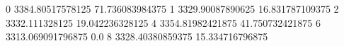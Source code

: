 0 3384.80517578125 71.736083984375
1 3329.90087890625 16.831787109375
2 3332.111328125 19.042236328125
4 3354.81982421875 41.750732421875
6 3313.069091796875 0.0
8 3328.40380859375 15.334716796875
